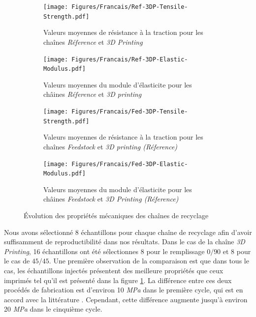 \begin{figure}[!ht]
	\centering
	\begin{subfigure}[t]{0.49\textwidth}
		\centering
		\texttt{[image: Figures/Francais/Ref-3DP-Tensile-Strength.pdf]}		
		\caption[]{Valeurs moyennes de résistance à la traction  pour les chaînes  \textit{Réference} et \textit{3D Printing}}
		\label{Comparation.tensile.Reference.vs.3DP.Frances}
	\end{subfigure}%
	\hfill
	\begin{subfigure}[t]{0.47\textwidth}
		\centering
		\texttt{[image: Figures/Francais/Ref-3DP-Elastic-Modulus.pdf]}	
		\caption[]{Valeurs moyennes du module d'élasticite pour les châines \textit{Réference} et \textit{3D printing}}
		\label{Comparation.Modulus.Reference.vs.3DP.Frances}
	\end{subfigure}
	
	\vspace{0.5cm}		
	
	\begin{subfigure}[t]{0.49\textwidth}
		\centering
		\texttt{[image: Figures/Francais/Fed-3DP-Tensile-Strength.pdf]}		
		\caption[]{Valeurs moyennes de résistance à la traction  pour les chaînes  \textit{Feedstock} et \textit{3D printing (Réference)}}
		\label{Comparation.tensile.Feedstock.vs.3DP.compounding.Frances}
	\end{subfigure}%
	\hfill
	\begin{subfigure}[t]{0.47\textwidth}
		\centering
		\texttt{[image: Figures/Francais/Fed-3DP-Elastic-Modulus.pdf]}	
		\caption[]{Valeurs moyennes du module d'élasticite pour les châines \textit{Feedstock} et \textit{3D Printing (Réference)}}
		\label{Comparation.Module.Feedstock.vs.3DP.compounding.Frances}
	\end{subfigure}
	
	
	\caption[]{Évolution des propriétés mécaniques des chaînes de recyclage}
	\label{Comparation.mechanical.properties.Frances}
\end{figure}

Nous avons sélectionné 8 échantillons pour chaque chaîne de recyclage afin d'avoir suffisamment de reproductibilité dans nos résultats.
Dans le cas de la chaîne \textit{3D Printing}, 16 échantillons ont été sélectionnes 8 pour le remplissage $0/90$ et 8 pour le cas de  $45/45$.
Une première observation de la comparaison est que dans tous le cas, les échantillons injectés présentent des meilleure propriétés que ceux imprimés tel qu'il est présenté dans la figure \ref{Comparation.tensile.Reference.vs.3DP.Frances}. 
La différence entre ces deux procédés de fabrication est d'environ 10 \textit{MPa} dans le première cycle, qui est en accord avec la littérature  \parencite{Tymrak2014a, Wittbrodt2015}.
Cependant, 	cette différence augmente jusqu'à  environ 20 \textit{MPa} dans le cinquième cycle.

